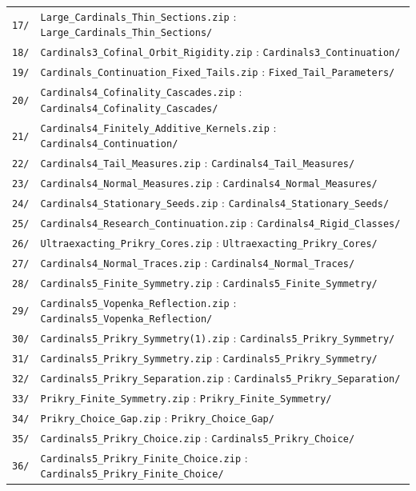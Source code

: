\documentclass[11pt,letterpaper]{article}
\theoremstyle{definition}
\numberwithin{equation}{section}
\begin{document}
\begin{center}
\begin{tabularx}{\textwidth}{@{}lY@{}}
\nolinkurl{17/}&\nolinkurl{Large_Cardinals_Thin_Sections.zip} : \nolinkurl{Large_Cardinals_Thin_Sections/}\\
\nolinkurl{18/}&\nolinkurl{Cardinals3_Cofinal_Orbit_Rigidity.zip} : \nolinkurl{Cardinals3_Continuation/}\\
\nolinkurl{19/}&\nolinkurl{Cardinals_Continuation_Fixed_Tails.zip} : \nolinkurl{Fixed_Tail_Parameters/}\\
\nolinkurl{20/}&\nolinkurl{Cardinals4_Cofinality_Cascades.zip} : \nolinkurl{Cardinals4_Cofinality_Cascades/}\\
\nolinkurl{21/}&\nolinkurl{Cardinals4_Finitely_Additive_Kernels.zip} : \nolinkurl{Cardinals4_Continuation/}\\
\nolinkurl{22/}&\nolinkurl{Cardinals4_Tail_Measures.zip} : \nolinkurl{Cardinals4_Tail_Measures/}\\
\nolinkurl{23/}&\nolinkurl{Cardinals4_Normal_Measures.zip} : \nolinkurl{Cardinals4_Normal_Measures/}\\
\nolinkurl{24/}&\nolinkurl{Cardinals4_Stationary_Seeds.zip} : \nolinkurl{Cardinals4_Stationary_Seeds/}\\
\nolinkurl{25/}&\nolinkurl{Cardinals4_Research_Continuation.zip} : \nolinkurl{Cardinals4_Rigid_Classes/}\\
\nolinkurl{26/}&\nolinkurl{Ultraexacting_Prikry_Cores.zip} : \nolinkurl{Ultraexacting_Prikry_Cores/}\\
\nolinkurl{27/}&\nolinkurl{Cardinals4_Normal_Traces.zip} : \nolinkurl{Cardinals4_Normal_Traces/}\\
\nolinkurl{28/}&\nolinkurl{Cardinals5_Finite_Symmetry.zip} : \nolinkurl{Cardinals5_Finite_Symmetry/}\\
\nolinkurl{29/}&\nolinkurl{Cardinals5_Vopenka_Reflection.zip} : \nolinkurl{Cardinals5_Vopenka_Reflection/}\\
\nolinkurl{30/}&\nolinkurl{Cardinals5_Prikry_Symmetry(1).zip} : \nolinkurl{Cardinals5_Prikry_Symmetry/}\\
\nolinkurl{31/}&\nolinkurl{Cardinals5_Prikry_Symmetry.zip} : \nolinkurl{Cardinals5_Prikry_Symmetry/}\\
\nolinkurl{32/}&\nolinkurl{Cardinals5_Prikry_Separation.zip} : \nolinkurl{Cardinals5_Prikry_Separation/}\\
\nolinkurl{33/}&\nolinkurl{Prikry_Finite_Symmetry.zip} : \nolinkurl{Prikry_Finite_Symmetry/}\\
\nolinkurl{34/}&\nolinkurl{Prikry_Choice_Gap.zip} : \nolinkurl{Prikry_Choice_Gap/}\\
\nolinkurl{35/}&\nolinkurl{Cardinals5_Prikry_Choice.zip} : \nolinkurl{Cardinals5_Prikry_Choice/}\\
\nolinkurl{36/}&\nolinkurl{Cardinals5_Prikry_Finite_Choice.zip} : \nolinkurl{Cardinals5_Prikry_Finite_Choice/}\\
\bottomrule
\end{tabularx}
\end{center}
\end{document}
